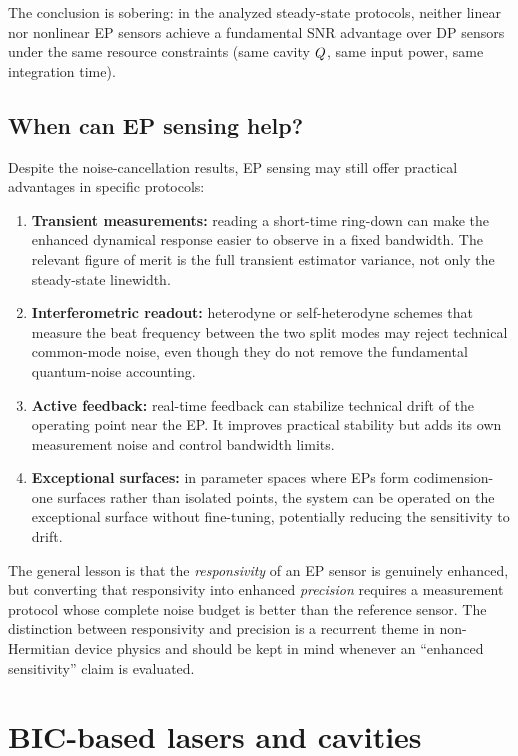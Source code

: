 The conclusion is sobering: in the analyzed steady-state protocols,
neither linear nor nonlinear EP sensors achieve a fundamental SNR
advantage over DP sensors under the same resource constraints (same
cavity $Q$, same input power, same integration time).

\subsection{When can EP sensing help?}
\label{ssec:ep-when}

Despite the noise-cancellation results, EP sensing may still offer
practical advantages in specific protocols:
\begin{enumerate}
 \item \textbf{Transient measurements:} reading a short-time ring-down
 can make the enhanced dynamical response easier to observe in a fixed
 bandwidth. The relevant figure of merit is the full transient estimator
 variance, not only the steady-state linewidth.
 \item \textbf{Interferometric readout:} heterodyne or self-heterodyne
 schemes that measure the beat frequency between the two split
 modes may reject technical common-mode noise, even though they do not
 remove the fundamental quantum-noise accounting.
 \item \textbf{Active feedback:} real-time feedback can stabilize
 technical drift of the operating point near the EP. It improves
 practical stability but adds its own measurement noise and control
 bandwidth limits.
 \item \textbf{Exceptional surfaces:} in parameter spaces where EPs
 form codimension-one surfaces rather than isolated points,
 the system can be operated on the exceptional surface without
 fine-tuning, potentially reducing the sensitivity to drift.
\end{enumerate}
The general lesson is that the \emph{responsivity} of an EP sensor is
genuinely enhanced, but converting that responsivity into enhanced
\emph{precision} requires a measurement protocol whose complete noise
budget is better than the reference sensor. The distinction between responsivity and
precision is a recurrent theme in non-Hermitian device physics and
should be kept in mind whenever an ``enhanced sensitivity'' claim is
evaluated.


\section{BIC-based lasers and cavities}
\label{sec:bic-devices}

